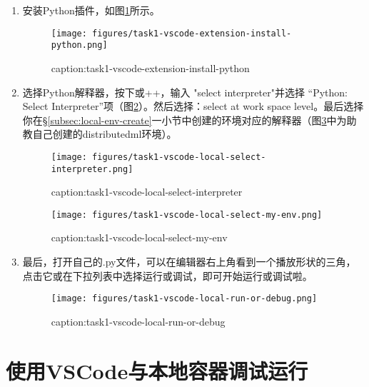 \begin{enumerate}
    \item 安装Python插件，如图\ref{fig:task1-vscode-extension-install-python}所示。
        \begin{figure}[htbp]
            \centering
            \texttt{[image: figures/task1-vscode-extension-install-python.png]}
            \caption{caption:task1-vscode-extension-install-python}
            \label{fig:task1-vscode-extension-install-python}
        \end{figure}
    \item 选择Python解释器，按下或++，输入 "select interpreter"并选择 “Python: Select Interpreter”项（图\ref{fig:task1-vscode-local-select-interpreter}）。然后选择：select at work space level。最后选择你在\S\ref{subsec:local-env-create}一小节中创建的环境对应的解释器（图\ref{fig:task1-vscode-local-select-my-env}中为助教自己创建的distributedml环境）。
        \begin{figure}[htbp]
            \centering
            \texttt{[image: figures/task1-vscode-local-select-interpreter.png]}
            \caption{caption:task1-vscode-local-select-interpreter}
            \label{fig:task1-vscode-local-select-interpreter}
        \end{figure}
        \begin{figure}[htbp]
            \centering
            \texttt{[image: figures/task1-vscode-local-select-my-env.png]}
            \caption{caption:task1-vscode-local-select-my-env}
            \label{fig:task1-vscode-local-select-my-env}
        \end{figure}
    \item 最后，打开自己的.py文件，可以在编辑器右上角看到一个播放形状的三角，点击它或在下拉列表中选择运行或调试，即可开始运行或调试啦。
    \begin{figure}[htbp]
        \centering
        \texttt{[image: figures/task1-vscode-local-run-or-debug.png]}
        \caption{caption:task1-vscode-local-run-or-debug}
        \label{fig:task1-vscode-local-run-or-debug}
    \end{figure}
\end{enumerate}


\section{使用VSCode与本地容器调试运行}\label{sec:vscode-and-docker-container}

